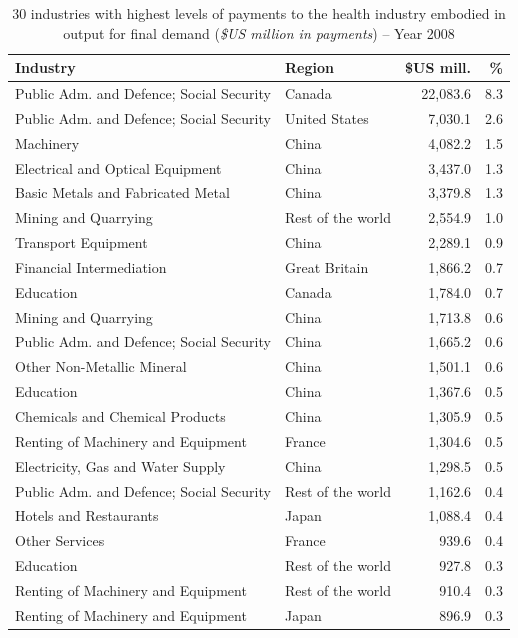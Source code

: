 \documentclass[a4paper,12pt]{article}
\begin{document}
\begin{table} %
\caption{30 industries with highest levels of payments to the health industry embodied in output for final demand (\textit{\$US million in payments}) -- Year 2008} 
\begin{center}
\small \begin{tabular}{llrr}
 \textbf{Industry} & \textbf{Region} & \textbf{\$US mill.}&\textbf{\%}\\ 
 \hline
Public Adm. and Defence; Social Security & Canada &  22,083.6  & 8.3\\ 
Public Adm. and Defence; Social Security & United States &  7,030.1  & 2.6\\ 
Machinery & China &  4,082.2  & 1.5\\ 
Electrical and Optical Equipment & China &  3,437.0  & 1.3\\ 
Basic Metals and Fabricated Metal & China &  3,379.8  & 1.3\\ 
Mining and Quarrying & Rest of the world &  2,554.9  & 1.0\\ 
Transport Equipment & China &  2,289.1  & 0.9\\ 
Financial Intermediation & Great Britain &  1,866.2  & 0.7\\ 
Education & Canada &  1,784.0  & 0.7\\ 
Mining and Quarrying & China &  1,713.8  & 0.6\\ 
Public Adm. and Defence; Social Security & China &  1,665.2  & 0.6\\ 
Other Non-Metallic Mineral & China &  1,501.1  & 0.6\\ 
Education & China &  1,367.6  & 0.5\\ 
Chemicals and Chemical Products & China &  1,305.9  & 0.5\\ 
Renting of Machinery and Equipment & France &  1,304.6  & 0.5\\ 
Electricity, Gas and Water Supply & China &  1,298.5  & 0.5\\ 
Public Adm. and Defence; Social Security & Rest of the world &  1,162.6  & 0.4\\ 
Hotels and Restaurants & Japan &  1,088.4  & 0.4\\ 
Other Services & France &  939.6  & 0.4\\ 
Education & Rest of the world &  927.8  & 0.3\\ 
Renting of Machinery and Equipment & Rest of the world &  910.4  & 0.3\\ 
Renting of Machinery and Equipment & Japan &  896.9  & 0.3\\ 

\end{tabular}
\end{center}
\end{table}
\end{document}
